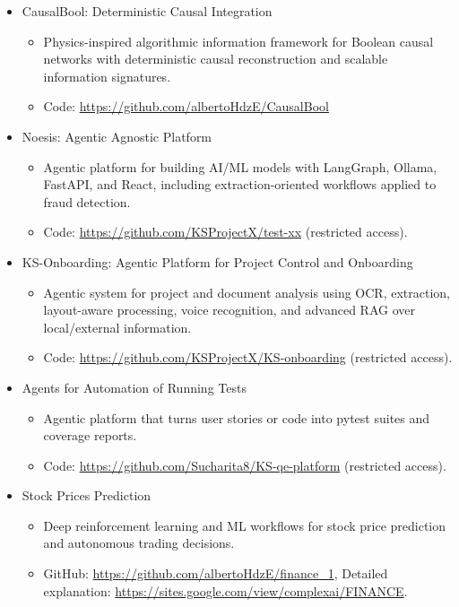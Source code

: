 \documentclass{article}
\begin{document}
\begin{itemize}
\item \hypertarget{proj-causalbool}{}CausalBool: Deterministic Causal Integration
\begin{itemize}
\item Physics-inspired algorithmic information framework for Boolean causal networks with deterministic causal reconstruction and scalable information signatures.
\item Code: \url{https://github.com/albertoHdzE/CausalBool}
\end{itemize}

\item \hypertarget{proj-noesis}{}Noesis: Agentic Agnostic Platform
\begin{itemize}
\item Agentic platform for building AI/ML models with LangGraph, Ollama, FastAPI, and React, including extraction-oriented workflows applied to fraud detection.
\item Code: \url{https://github.com/KSProjectX/test-xx} (restricted access).
\end{itemize}

\item \hypertarget{proj-ksonboarding}{}KS-Onboarding: Agentic Platform for Project Control and Onboarding
\begin{itemize}
\item Agentic system for project and document analysis using OCR, extraction, layout-aware processing, voice recognition, and advanced RAG over local/external information.
\item Code: \url{https://github.com/KSProjectX/KS-onboarding} (restricted access).
\end{itemize}

\item \hypertarget{proj-tests}{}Agents for Automation of Running Tests
\begin{itemize}
\item Agentic platform that turns user stories or code into pytest suites and coverage reports.
\item Code: \url{https://github.com/Sucharita8/KS-qe-platform} (restricted access).
\end{itemize}

\item \hypertarget{proj-stock}{}Stock Prices Prediction
\begin{itemize}
\item Deep reinforcement learning and ML workflows for stock price prediction and autonomous trading decisions.
\item GitHub: \url{https://github.com/albertoHdzE/finance_1}, Detailed explanation: \url{https://sites.google.com/view/complexai/FINANCE}.
\end{itemize}


\end{itemize}
\end{document}
